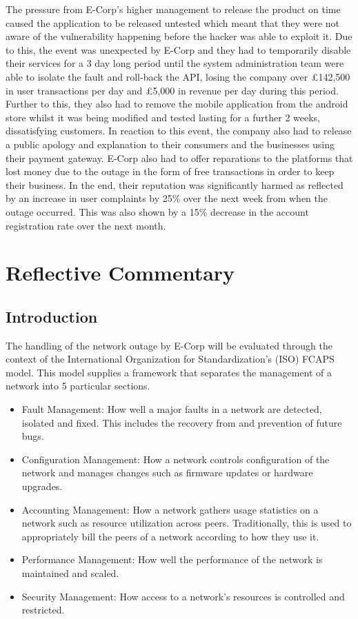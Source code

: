 \documentclass[]{report}
\begin{document}
The pressure from E-Corp's higher management to release the product on time caused the application to be released untested which meant that they were not aware of the vulnerability happening before the hacker was able to exploit it. Due to this, the event was unexpected by E-Corp and they had to temporarily disable their services for a 3 day long period until the system administration team were able to isolate the fault and roll-back the API, losing the company over £142,500 in user transactions per day and £5,000 in revenue per day during this period. Further to this, they also had to remove the mobile application from the android store whilst it was being modified and tested lasting for a further 2 weeks, dissatisfying customers. In reaction to this event, the company also had to release a public apology and explanation to their consumers and the businesses using their payment gateway. E-Corp also had to offer reparations to the platforms that lost money due to the outage in the form of free transactions in order to keep their business. In the end, their reputation was significantly harmed as reflected by an increase in user complaints by 25\% over the next week from when the outage occurred. This was also shown by a 15\% decrease in the account registration rate over the next month. 

\chapter*{Reflective Commentary}

\section*{Introduction}
The handling of the network outage by E-Corp will be evaluated through the context of the International Organization for Standardization's (ISO) FCAPS model. This model supplies a framework that separates the management of a network into 5 particular sections.

\begin{itemize}
	\item Fault Management:
	How well a major faults in a network are detected, isolated and fixed. This includes the recovery from and prevention of future bugs. 
	\item Configuration Management:
	How a network controls configuration of the network and manages changes such as firmware updates or hardware upgrades.
	\item Accounting Management:
	How a network gathers usage statistics on a network such as resource utilization across peers. Traditionally, this is used to appropriately bill the peers of a network according to how they use it.
	\item Performance Management:
	How well the performance of the network is maintained and scaled.
	\item Security Management:
	How access to a network's resources is controlled and restricted.
\end{itemize}
\end{document}
